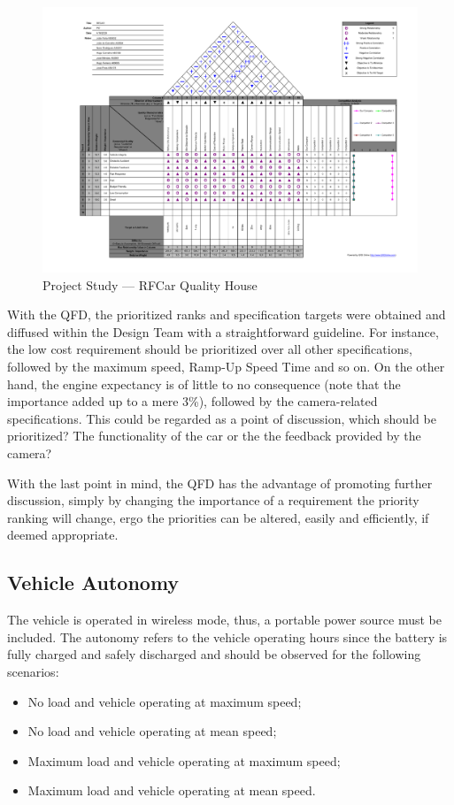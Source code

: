 \begin{figure}
   \centering
       \includegraphics[page=1,width=1.0\textwidth]{sec/pdf/QFDv3.pdf} 
 \caption{Project Study --- RFCar Quality House}%
\label{fig:QFD}
\end{figure}
%
With the QFD, the prioritized ranks and specification targets were obtained and diffused within the Design Team with a
straightforward guideline. For instance, the low cost requirement should be
prioritized over all other specifications, followed by the maximum speed,
Ramp-Up Speed Time and so on.  On the other hand, the engine expectancy is of
little to no consequence (note that the importance added up to a mere 3\%),
followed by the camera-related specifications. This could be regarded as
a point of discussion, which should be prioritized? The functionality of the car
or the the feedback provided by the camera?

With the last point in mind, the QFD has the advantage of promoting further
discussion, simply by changing the importance of a requirement the priority ranking will change, ergo
the priorities can be altered, easily and efficiently, if deemed appropriate.
\newpage
%
\subsection{Vehicle Autonomy}%
\label{sec:autonomy-specs}
The vehicle is operated in wireless mode, thus, a portable power source must be included. The autonomy refers to the vehicle operating hours since the battery is fully charged and safely discharged and should be observed for the following scenarios:
\begin{itemize}
\item No load and vehicle operating at maximum speed;
\item No load and vehicle operating at mean speed;
\item Maximum load and vehicle operating at maximum speed;
\item Maximum load and vehicle operating at mean speed.
\end{itemize}
